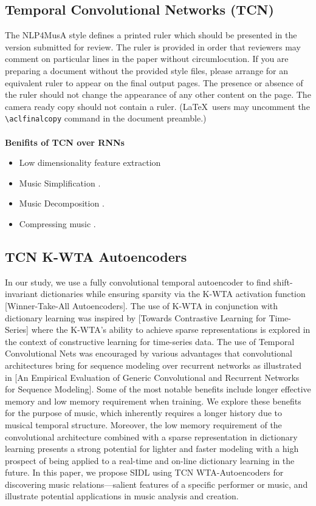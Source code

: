 \documentclass[11pt,a4paper]{article}
\begin{document}
\subsection{Temporal Convolutional Networks (TCN) }
The NLP4MusA style defines a printed ruler which should be presented in the
version submitted for review.  The ruler is provided in order that
reviewers may comment on particular lines in the paper without
circumlocution.  If you are preparing a document without the provided
style files, please arrange for an equivalent ruler to
appear on the final output pages.  The presence or absence of the ruler
should not change the appearance of any other content on the page.  The
camera ready copy should not contain a ruler. (\LaTeX\ users may uncomment the {\small\verb|\aclfinalcopy|} command in the document preamble.)  
\\
\\
\textbf{Benifits of TCN over RNNs  \citep{Gusfield:97}} 
\begin{itemize}
\item Low dimensionality feature extraction 
\item Music Simplification \cite{Ando2005}.
\item Music Decomposition \cite{Ando2005}.
\item Compressing music \cite{borsch2011}.
\end{itemize}


\subsection{TCN K-WTA Autoencoders}

In our study, we use a fully convolutional temporal autoencoder to find shift-invariant dictionaries while ensuring sparsity via the K-WTA activation function [Winner-Take-All Autoencoders]. The use of K-WTA in conjunction with dictionary learning was inspired by [Towards Contrastive Learning for Time-Series] where the K-WTA’s ability to achieve sparse representations is explored in the context of constructive learning for time-series data. The use of Temporal Convolutional Nets was encouraged by various advantages that convolutional architectures bring for sequence modeling over recurrent networks as illustrated in [An Empirical Evaluation of Generic Convolutional and Recurrent Networks for Sequence Modeling]. Some of the most notable benefits include longer effective memory and low memory requirement when training. We explore these benefits for the purpose of music, which inherently requires a longer history due to musical temporal structure. Moreover, the low memory requirement of the convolutional architecture combined with a sparse representation in dictionary learning presents a strong potential for lighter and faster modeling with a high prospect of being applied to a real-time and on-line dictionary learning in the future. In this paper, we propose SIDL using TCN WTA-Autoencoders for discovering music relations—salient features of a specific performer or music, and illustrate potential applications in music analysis and creation. 
\end{document}

